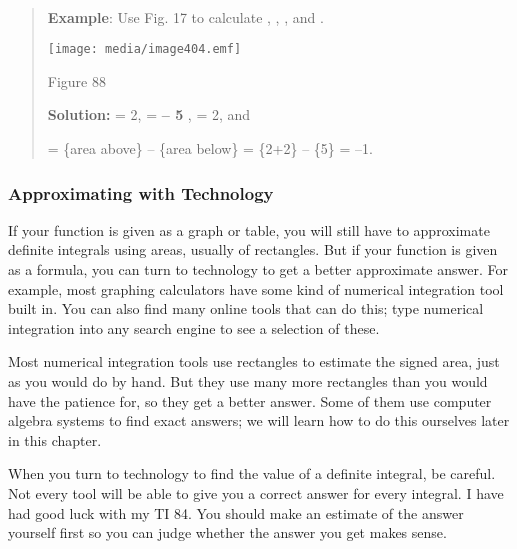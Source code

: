 \textbf{\\
}

\begin{quote}
\textbf{Example}: Use Fig. 17 to calculate , , , and .

\texttt{[image: media/image404.emf]}

Figure 88

\textbf{Solution:} = 2, = \textbf{-- 5} , = 2, and

= \{area above\} -- \{area below\} = \{2+2\} -- \{5\} = --1.
\end{quote}

\subsubsection{Approximating with
Technology}\label{approximating-with-technology}

If your function is given as a graph or table, you will still have to
approximate definite integrals using areas, usually of rectangles. But
if your function is given as a formula, you can turn to technology to
get a better approximate answer. For example, most graphing calculators
have some kind of numerical integration tool built in. You can also find
many online tools that can do this; type numerical integration into any
search engine to see a selection of these.

Most numerical integration tools use rectangles to estimate the signed
area, just as you would do by hand. But they use many more rectangles
than you would have the patience for, so they get a better answer. Some
of them use computer algebra systems to find exact answers; we will
learn how to do this ourselves later in this chapter.

When you turn to technology to find the value of a definite integral, be
careful. Not every tool will be able to give you a correct answer for
every integral. I have had good luck with my TI 84. You should make an
estimate of the answer yourself first so you can judge whether the
answer you get makes sense.

